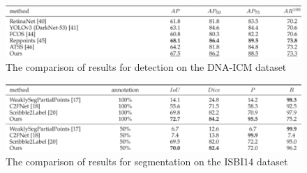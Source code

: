 \begin{figure}[H]
    \begin{centering}
    \includegraphics[width=14cm]{assets/images/rw-ts-det.png}
    \par\end{centering}
    \caption{The comparison of results for detection on the DNA-ICM dataset}
    \label{fig:rw-ts-det}
\end{figure}

\begin{figure}[H]
    \begin{centering}
    \includegraphics[width=14cm]{assets/images/rw-ts-seg-2.png}
    \par\end{centering}
    \caption{The comparison of results for segmentation on the ISBI14 dataset}
    \label{fig:rw-ts-seg-2}
\end{figure}